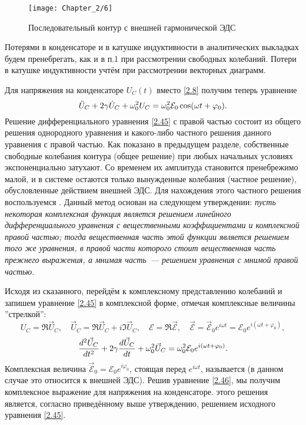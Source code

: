 \begin{figure}[h!]
	\centering
	\texttt{[image: Chapter\_2/6]}
	\caption{Последовательный контур с внешней гармонической ЭДС}
\end{figure}

Потерями в конденсаторе и в катушке индуктивности в аналитических выкладках
будем пренебрегать, как и в п.1 при рассмотрении свободных колебаний. Потери в
катушке индуктивности учтём при рассмотрении векторных диаграмм.

Для напряжения на конденсаторе $U_C(t)$ вместо \eqref{2.8} получим теперь
уравнение
\begin{equation}\eqmark{2.45}
\ddot{U}_C+2\gamma \dot{U}_C+\omega_0^2U_C=\omega_0^2\mathcal{E}_0\cos(\omega t+
\varphi_0).
\end{equation}
Решение  дифференциального уравнения \eqref{2.45} с правой
частью состоит из общего решения однородного уравнения и какого-либо частного
решения данного уравнения с правой частью. Как показано в предыдущем разделе,
собственные свободные колебания контура (общее решение) при любых начальных
условиях экспоненциально затухают. Со временем их амплитуда становится
пренебрежимо малой, и в системе остаются только вынужденные колебания (частное
решение), обусловленные действием внешней ЭДС. Для нахождения этого частного
решения воспользуемся . Данный метод
основан на следующем утверждении: \emph{пусть некоторая комплексная функция
является решением линейного дифференциального уравнения с вещественными
коэффициентами и комплексной правой частью; тогда вещественная часть этой
функции является решением того же уравнения, в правой части которого стоит
вещественная часть прежнего выражения, а мнимая часть~--- решением уравнения с
мнимой правой частью}.

Исходя из сказанного, перейдём к комплексному представлению колебаний и запишем
уравнение \eqref{2.45} в комплексной форме, отмечая комплексные величины
''стрелкой'':
\begin{equation*}
U_C=\Re \vec U_C, \quad \vec U_C=\Re \vec U_C+i\Im \vec U_C, \quad
\mathcal{E}=\Re \vec{\mathcal{E}}, \quad \vec{\mathcal{E}}=
\vec{\mathcal{E}}_0e^{i\omega t}=\mathcal{E}_0e^{i(\omega t+\varphi_0)},
\end{equation*}
\begin{equation}\eqmark{2.46}
\dfrac{d^2\vec U_C}{dt^2}+2\gamma\dfrac{d\vec U_C}{dt}+\omega_0^2\vec
U_C=\omega_0^2\mathcal{E}_0e^{i(\omega t+\varphi_0)}.
\end{equation}
Комплексная величина $\vec{\mathcal{E}}_0=\mathcal{E}_0e^{i\varphi_0}$, стоящая
перед $e^{i\omega t}$, называется  (в данном
случае это относится к внешней ЭДС). Решив уравнение \eqref{2.46}, мы получим
комплексное выражение для напряжения на конденсаторе.  этого решения является, согласно приведённому выше утверждению, решением
исходного уравнения \eqref{2.45}.

